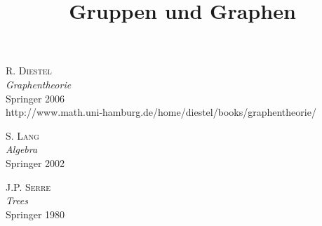 \documentclass[a4paper, 12pt, twoside]{article}
\title{\Huge \textbf{
\textsf{Gruppen und Graphen}}}
\date{}
\begin{document}
\maketitle
\begin{center}
\end{center}
\newpage
\tableofcontents
\newpage





\appendix



\newpage
\begin{thebibliography}{10}


 \textsc{R. Diestel}\\
\textsl{Graphentheorie}\\
Springer 2006\\
\textsf{http://www.math.uni-hamburg.de/home/diestel/books/graphentheorie/}

 \textsc{S. Lang}\\
\textsl{Algebra}\\
Springer 2002

 \textsc{J.P. Serre}\\
\textsl{Trees}\\
Springer 1980


\end{thebibliography}

\newpage
{}
\small
\printindex
\end{document}
